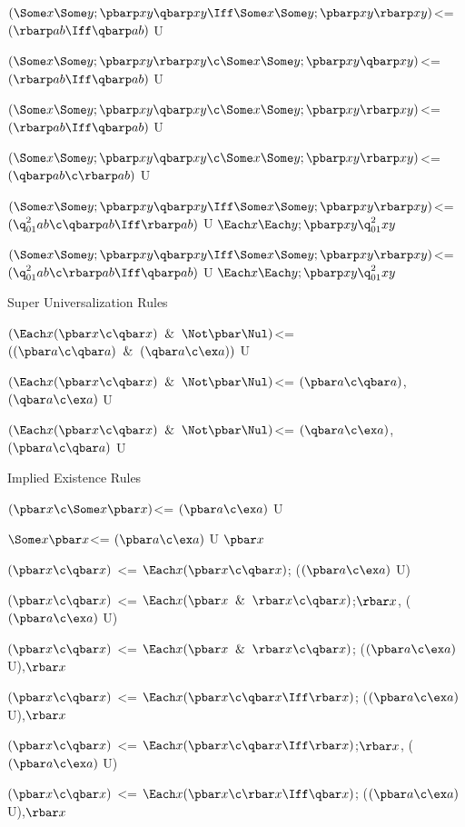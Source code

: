 $(\Some x \Some y ; \pbarp xy \qbarp xy \Iff \Some x \Some y ;\pbarp xy \rbarp xy)$<=$(\rbarp ab \Iff \qbarp ab)$ U

$(\Some x \Some y ; \pbarp xy \rbarp xy \c \Some x \Some y ;\pbarp xy \qbarp xy)$<=$(\rbarp ab \Iff \qbarp ab)$ U

$(\Some x \Some y ; \pbarp xy \qbarp xy \c \Some x \Some y ;\pbarp xy \rbarp xy)$<=$(\rbarp ab \Iff \qbarp ab)$ U

$(\Some x \Some y ; \pbarp xy \qbarp xy \c \Some x \Some y ;\pbarp xy \rbarp xy)$<=$(\qbarp ab \c \rbarp ab)$ U

$(\Some x \Some y ; \pbarp xy \qbarp xy \Iff \Some x \Some y ; \pbarp xy \rbarp xy)$<= $(\q^{2}_{01}ab \c \qbarp ab \Iff \rbarp ab)$ U $\Each x \Each y ; \pbarp xy \q^{2}_{01}xy$

$(\Some x \Some y ; \pbarp xy \qbarp xy \Iff \Some x \Some y ; \pbarp xy \rbarp xy)$<= $(\q^{2}_{01}ab \c \rbarp ab \Iff \qbarp ab)$ U $\Each x \Each y ; \pbarp xy \q^{2}_{01}xy$

\lineb

Super Universalization Rules
\lineb

$(\Each x (\pbar x \c \qbar x) \And \Not\pbar \Nul)$<= $((\pbar a \c \qbar a)\And(\qbar a \c \ex a))$ U

$(\Each x (\pbar x \c \qbar x) \And \Not\pbar \Nul)$<= $(\pbar a \c \qbar a)$,$(\qbar a \c \ex a)$ U

$(\Each x (\pbar x \c \qbar x) \And \Not\pbar \Nul)$<= $(\qbar a \c \ex a)$, $(\pbar a \c \qbar a)$ U

Implied Existence Rules

$(\pbar x \c \Some x \pbar x)$<= $(\pbar a \c \ex a) $ U 

$\Some x \pbar x$<= $(\pbar a \c \ex a) $ U $\pbar x$

$(\pbar x \c \qbar x)$ <= $\Each x (\pbar x \c \qbar x)$; ($(\pbar a \c \ex a)$ U)

$(\pbar x \c \qbar x)$ <= $\Each x (\pbar x \And \rbar x\c \qbar x)$;$\rbar x$, ($(\pbar a \c \ex a)$ U)

$(\pbar x \c \qbar x)$ <= $\Each x (\pbar x \And \rbar x\c \qbar x)$; ($(\pbar a \c \ex a)$ U),$\rbar x$

$(\pbar x \c \qbar x)$ <= $\Each x (\pbar x \c \qbar x\Iff \rbar x)$; ($(\pbar a \c \ex a)$ U),$\rbar x$

$(\pbar x \c \qbar x)$ <= $\Each x (\pbar x \c \qbar x\Iff \rbar x)$;$\rbar x$, ($(\pbar a \c \ex a)$ U)

$(\pbar x \c \qbar x)$ <= $\Each x (\pbar x \c \rbar x\Iff \qbar x)$; ($(\pbar a \c \ex a)$ U),$\rbar x$

